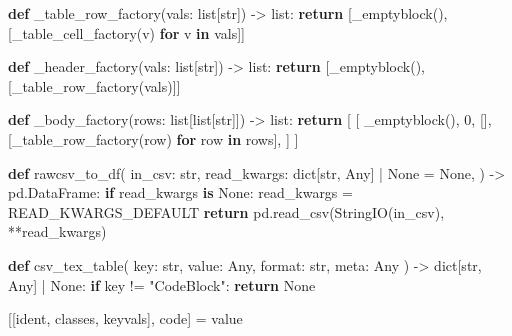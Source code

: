 \documentclass[
]{article}
\newenvironment{Shaded}{}{}
\newcommand{\BuiltInTok}[1]{\textcolor[rgb]{0.00,0.50,0.00}{#1}}
\newcommand{\ControlFlowTok}[1]{\textcolor[rgb]{0.00,0.44,0.13}{\textbf{#1}}}
\newcommand{\DecValTok}[1]{\textcolor[rgb]{0.25,0.63,0.44}{#1}}
\newcommand{\KeywordTok}[1]{\textcolor[rgb]{0.00,0.44,0.13}{\textbf{#1}}}
\newcommand{\NormalTok}[1]{#1}
\newcommand{\OperatorTok}[1]{\textcolor[rgb]{0.40,0.40,0.40}{#1}}
\newcommand{\StringTok}[1]{\textcolor[rgb]{0.25,0.44,0.63}{#1}}
\newcommand{\VariableTok}[1]{\textcolor[rgb]{0.10,0.09,0.49}{#1}}
\begin{document}
\begin{Shaded}
\begin{Highlighting}[]
\KeywordTok{def}\NormalTok{ \_table\_row\_factory(vals: }\BuiltInTok{list}\NormalTok{[}\BuiltInTok{str}\NormalTok{]) }\OperatorTok{{-}\textgreater{}} \BuiltInTok{list}\NormalTok{:}
    \ControlFlowTok{return}\NormalTok{ [\_emptyblock(), [\_table\_cell\_factory(v) }\ControlFlowTok{for}\NormalTok{ v }\KeywordTok{in}\NormalTok{ vals]]}


\KeywordTok{def}\NormalTok{ \_header\_factory(vals: }\BuiltInTok{list}\NormalTok{[}\BuiltInTok{str}\NormalTok{]) }\OperatorTok{{-}\textgreater{}} \BuiltInTok{list}\NormalTok{:}
    \ControlFlowTok{return}\NormalTok{ [\_emptyblock(), [\_table\_row\_factory(vals)]]}


\KeywordTok{def}\NormalTok{ \_body\_factory(rows: }\BuiltInTok{list}\NormalTok{[}\BuiltInTok{list}\NormalTok{[}\BuiltInTok{str}\NormalTok{]]) }\OperatorTok{{-}\textgreater{}} \BuiltInTok{list}\NormalTok{:}
    \ControlFlowTok{return}\NormalTok{ [}
\NormalTok{        [}
\NormalTok{            \_emptyblock(),}
            \DecValTok{0}\NormalTok{,}
\NormalTok{            [],}
\NormalTok{            [\_table\_row\_factory(row) }\ControlFlowTok{for}\NormalTok{ row }\KeywordTok{in}\NormalTok{ rows],}
\NormalTok{        ]}
\NormalTok{    ]}


\KeywordTok{def}\NormalTok{ rawcsv\_to\_df(}
\NormalTok{    in\_csv: }\BuiltInTok{str}\NormalTok{,}
\NormalTok{    read\_kwargs: }\BuiltInTok{dict}\NormalTok{[}\BuiltInTok{str}\NormalTok{, Any] }\OperatorTok{|} \VariableTok{None} \OperatorTok{=} \VariableTok{None}\NormalTok{,}
\NormalTok{) }\OperatorTok{{-}\textgreater{}}\NormalTok{ pd.DataFrame:}
    \ControlFlowTok{if}\NormalTok{ read\_kwargs }\KeywordTok{is} \VariableTok{None}\NormalTok{:}
\NormalTok{        read\_kwargs }\OperatorTok{=}\NormalTok{ READ\_KWARGS\_DEFAULT}
    \ControlFlowTok{return}\NormalTok{ pd.read\_csv(StringIO(in\_csv), }\OperatorTok{**}\NormalTok{read\_kwargs)}


\KeywordTok{def}\NormalTok{ csv\_tex\_table(}
\NormalTok{    key: }\BuiltInTok{str}\NormalTok{, value: Any, }\BuiltInTok{format}\NormalTok{: }\BuiltInTok{str}\NormalTok{, meta: Any}
\NormalTok{) }\OperatorTok{{-}\textgreater{}} \BuiltInTok{dict}\NormalTok{[}\BuiltInTok{str}\NormalTok{, Any] }\OperatorTok{|} \VariableTok{None}\NormalTok{:}
    \ControlFlowTok{if}\NormalTok{ key }\OperatorTok{!=} \StringTok{"CodeBlock"}\NormalTok{:}
        \ControlFlowTok{return} \VariableTok{None}

\NormalTok{    [[ident, classes, keyvals], code] }\OperatorTok{=}\NormalTok{ value}


\end{Highlighting}
\end{Shaded}
\end{document}
